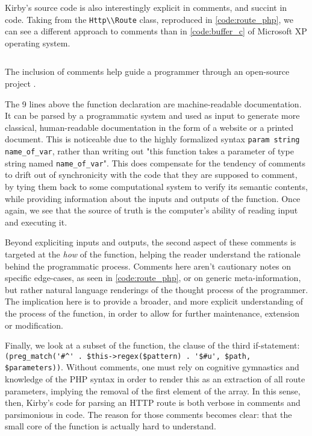Kirby's source code is also interestingly explicit in comments, and succint in code. Taking from the \lstinline{Http\\Route} class, reproduced in \autoref{code:route_php}, we can see a different approach to comments than in \autoref{code:buffer_c} of Microsoft XP operating system.

\begin{listing}
  \inputminted{php}{./corpus/route.php}
  \caption{The inclusion of comments help guide a programmer through an open-source project \citep{allgeier_route_2021}.}
  \label{code:route_php}
\end{listing}

The 9 lines above the function declaration are machine-readable documentation. It can be parsed by a programmatic system and used as input to generate more classical, human-readable documentation in the form of a website or a printed document. This is noticeable due to the highly formalized syntax \lstinline{param string name_of_var}, rather than writing out "this function takes a parameter of type string named \lstinline{name_of_var}". This does compensate for the tendency of comments to drift out of synchronicity with the code that they are supposed to comment, by tying them back to some computational system to verify its semantic contents, while providing information about the inputs and outputs of the function. Once again, we see that the source of truth is the computer's ability of reading input and executing it.

Beyond expliciting inputs and outputs, the second aspect of these comments is targeted at the \emph{how} of the function, helping the reader understand the rationale behind the programmatic process. Comments here aren't cautionary notes on specific edge-cases, as seen in \autoref{code:route_php}, or on generic meta-information, but rather natural language renderings of the thought process of the programmer. The implication here is to provide a broader, and more explicit understanding of the process of the function, in order to allow for further maintenance, extension or modification.

Finally, we look at a subset of the function, the clause of the third if-statement: \lstinline{(preg_match('#^' . $this->regex($pattern) . '$#u', $path, $parameters))}. Without comments, one must rely on cognitive gymnastics and knowledge of the PHP syntax in order to render this as an extraction of all route parameters, implying the removal of the first element of the array. In this sense, then, Kirby's code for parsing an HTTP route is both verbose in comments and parsimonious in code. The reason for those comments becomes clear: that the small core of the function is actually hard to understand.


